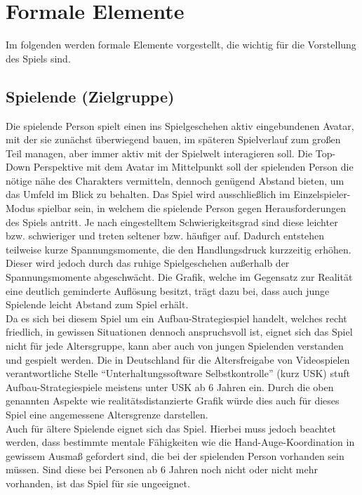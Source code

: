 \documentclass[paper=A4,pagesize=auto,12pt,headinclude=true,footinclude=true,BCOR=0mm,DIV=calc]{scrartcl}
\newcommand{\sectionspace}{
	\vspace{0.5cm}
}
\begin{document}
\sectionspace
\section{Formale Elemente}\label{sec:Formale_Elemente}
Im folgenden werden formale Elemente vorgestellt, die wichtig für die Vorstellung des Spiels sind.

\sectionspace
\subsection{Spielende (Zielgruppe)}\label{sec:Spieler}
Die spielende Person spielt einen ins Spielgeschehen aktiv eingebundenen Avatar, mit der sie zunächst überwiegend bauen, im späteren Spielverlauf zum großen Teil managen, aber immer aktiv mit der Spielwelt interagieren soll. Die Top-Down Perspektive mit dem Avatar im Mittelpunkt soll der spielenden Person die nötige nähe des Charakters vermitteln, dennoch genügend Abstand bieten, um das Umfeld im Blick zu behalten. Das Spiel wird ausschließlich im Einzelspieler-Modus spielbar sein, in welchem die spielende Person gegen Herausforderungen des Spiels antritt. Je nach eingestelltem Schwierigkeitsgrad sind diese leichter bzw. schwieriger und treten seltener bzw. häufiger auf. Dadurch entstehen teilweise kurze Spannungsmomente, die den Handlungsdruck kurzzeitig erhöhen. Dieser wird jedoch durch das ruhige Spielgeschehen außerhalb der Spannungsmomente abgeschwächt. Die Grafik, welche im Gegensatz zur Realität eine deutlich geminderte Auflösung besitzt, trägt dazu bei, dass auch junge Spielende leicht Abstand zum Spiel erhält.\\
Da es sich bei diesem Spiel um ein Aufbau-Strategiespiel handelt, welches recht friedlich, in gewissen Situationen dennoch anspruchsvoll ist, eignet sich das Spiel nicht für jede Altersgruppe, kann aber auch von jungen Spielenden verstanden und gespielt werden. Die in Deutschland für die Altersfreigabe von Videospielen verantwortliche Stelle "`Unterhaltungssoftware Selbstkontrolle"' (kurz USK) stuft Aufbau-Strategiespiele meistens unter USK ab 6 Jahren \cite{usk_6} ein. Durch die oben genannten Aspekte wie realitätsdistanzierte Grafik würde dies auch für dieses Spiel eine angemessene Altersgrenze darstellen. \\ 
Auch für ältere Spielende eignet sich das Spiel. Hierbei muss jedoch beachtet werden, dass bestimmte mentale Fähigkeiten wie die Hand-Auge-Koordination in gewissem Ausmaß gefordert sind, die bei der spielenden Person vorhanden sein müssen. Sind diese bei Personen ab 6 Jahren noch nicht oder nicht mehr vorhanden, ist das Spiel für sie ungeeignet.
\end{document}
